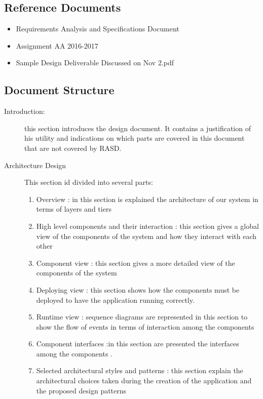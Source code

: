 \documentclass{article}
\begin{document}
\begin{flushleft}
\begin {itemize}
\end{itemize}

\subsection{Reference Documents} %
\begin {itemize}
\item  Requirements Analysis and Specifications Document
\item Assignment AA 2016-2017
\item Sample Design Deliverable Discussed on Nov 2.pdf

\end{itemize}

\subsection{Document Structure} %
\begin{description}
\item [Introduction:] this section introduces the design document. It contains a justification of his utility and indications on which parts are covered in this document that are not covered by RASD. 
\item  [Architecture Design ]  This section id divided into several parts:
\begin {enumerate}
\item  Overview : in this section is explained the architecture of our system in terms of layers and tiers
\item High level components and their interaction : this section gives a global view of the components of the system and how they interact with each other
\item Component view : this section gives a more detailed view of the components of the system
\item Deploying view : this section shows how the components must be deployed to have the application running correctly. 
\item Runtime view : sequence diagrams are represented in this section to show the flow of events in terms of interaction among the components
\item Component interfaces :in this section are presented the interfaces among the components .
\item Selected architectural styles and patterns : this section explain the architectural choices taken during the creation of the application and the proposed design patterns 

\end{enumerate}
\end{description}
\end{flushleft}
\end{document}
